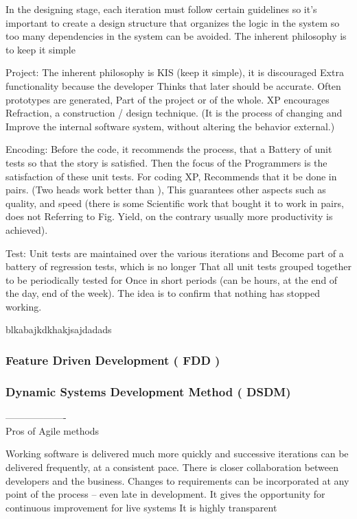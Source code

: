 In the designing stage, each iteration must follow certain guidelines so it's important to create a design structure that organizes the logic in the system so too many dependencies in the system can be avoided. The inherent philosophy is to keep it simple 

Project: The inherent philosophy is KIS (keep it simple), it is discouraged
Extra functionality because the developer
Thinks that later should be accurate. Often prototypes are generated,
Part of the project or of the whole. XP encourages
Refraction, a construction / design technique. (It is the process of changing and
Improve the internal software system, without altering the behavior
external.)

Encoding: Before the code, it recommends the process, that a
Battery of unit tests so that the story is satisfied. Then the focus of the
Programmers is the satisfaction of these unit tests. For coding XP,
Recommends that it be done in pairs. (Two heads work better than
), This guarantees other aspects such as quality, and speed (there is some
Scientific work that bought it to work in pairs, does not
Referring to Fig.
Yield, on the contrary usually more productivity is achieved).

Test: Unit tests are maintained over the various iterations and
Become part of a battery of regression tests, which is no longer
That all unit tests grouped together to be periodically tested for
Once in short periods (can be hours, at the end of the day, end of the week).
The idea is to confirm that nothing has stopped working.


blkabajkdkhakjsajdadads

\subsubsection{Feature Driven Development ( FDD )}
\subsubsection{Dynamic Systems Development Method ( DSDM) }
-------------------\\



Pros of Agile methods

Working software is delivered much more quickly and successive iterations can be delivered frequently, at a consistent pace.
There is closer collaboration between developers and the business.
Changes to requirements can be incorporated at any point of the process – even late in development.
It gives the opportunity for continuous improvement for live systems
It is highly transparent

